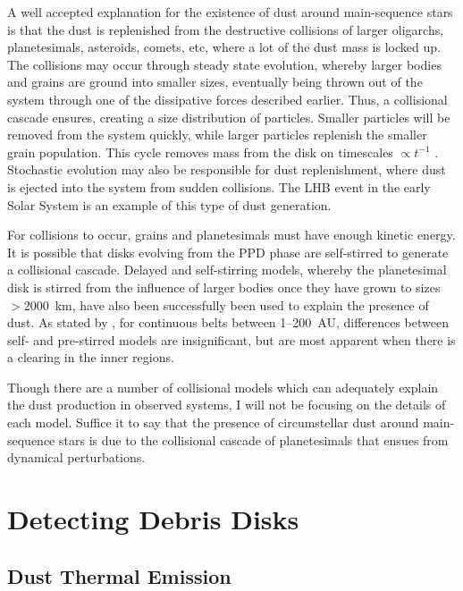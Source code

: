     A well accepted explanation for the existence of dust around main-sequence stars is that the dust is replenished from the destructive collisions of larger oligarchs, planetesimals, asteroids, comets, etc, where a lot of the dust mass is locked up. The collisions may occur through steady state evolution, whereby larger bodies and grains are ground into smaller sizes, eventually being thrown out of the system through one of the dissipative forces described earlier. Thus, a collisional cascade ensures, creating a size distribution of particles. Smaller particles will be removed from the system quickly, while larger particles replenish the smaller grain population. This cycle removes mass from the disk on timescales $\propto t^{-1}$ \citep{Wyatt2007}. Stochastic evolution may also be responsible for dust replenishment, where dust is ejected into the system from sudden collisions. The LHB event in the early Solar System is an example of this type of dust generation. 
    
    For collisions to occur, grains and planetesimals must have enough kinetic energy. It is possible that disks evolving from the PPD phase are self-stirred to generate a collisional cascade. Delayed and self-stirring models, whereby the planetesimal disk is stirred from the influence of larger bodies once they have grown to sizes $>$2000~km, have also been successfully been used to explain the presence of dust. As stated by \citet{Wyatt2008}, for continuous belts between 1--200~AU, differences between self- and pre-stirred models are insignificant, but are most apparent when there is a clearing in the inner regions.
    
    Though there are a number of collisional models which can adequately explain the dust production in observed systems, I will not be focusing on the details of each model. Suffice it to say that the presence of circumstellar dust around main-sequence stars is due to the collisional cascade of planetesimals that ensues from dynamical perturbations.
    
\section{Detecting Debris Disks}\label{sec:detect_dd}

    \subsection{Dust Thermal Emission}

